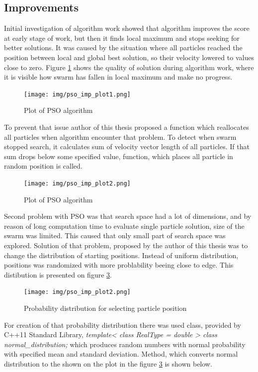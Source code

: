 \subsection{Improvements}
Initial investigation of algorithm work showed that algorithm improves the score at early stage of work, but then it finds local maximum 
and stops seeking for better solutions. It was caused by the situation where all particles reached the position between 
local and global best solution, so their velocity lowered to values close to zero. Figure \ref{img_pso_imp_plot1} shows the quality of solution 
during algorithm work, where it is visible how swarm has fallen in local maximum and make no progress.
\begin{figure}[ht]
\centering
	\texttt{[image: img/pso\_imp\_plot1.png]}
	\caption{Plot of PSO algorithm }
	\label{img_pso_imp_plot1}
\end{figure}

To prevent that issue author of this thesis proposed a function which reallocates all particles when algorithm encounter that problem. 
To detect when swarm stopped search, it calculates sum of velocity vector length of all particles. 
If that sum drops below some specified value, function, which places all particle in random position is called. 
\begin{figure}[ht]
	\centering
	\texttt{[image: img/pso\_imp\_plot2.png]}
	\caption{Plot of PSO algorithm }
	\label{img_pso_imp_plot2}
\end{figure}

Second problem with PSO was that search space had a lot of dimensions, and by reason of long computation time to evaluate single particle solution, 
size of the swarm was limited. This caused that only small part of search space was explored. Solution of that problem, 
proposed by the author of this thesis was to change the distribution of starting positions. Instead of uniform distribution, positions was randomized 
with more problability beeing close to edge. This distibution is presented on figure \ref{img_pso_imp_dist}.

\begin{figure}[ht]
	\centering
	\texttt{[image: img/pso\_imp\_plot2.png]}
	\caption{Probability distribution for selecting particle position}
	\label{img_pso_imp_dist}
\end{figure}

For creation of that probability distribution there was used class, provided by C++11 Standard Library, 
\textit{template< class RealType = double > class normal\_distribution;} which produces random numbers with normal probability
with specified mean and standard deviation. Method, which converts normal distribution to the shown on the plot in the figure \ref{img_pso_imp_dist} 
is shown below.

